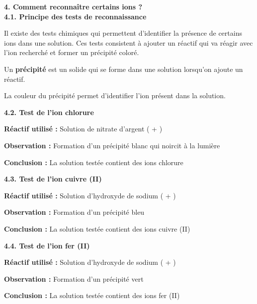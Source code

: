 \documentclass[11pt,a4paper]{article}
\begin{document}
\textbf{4. Comment reconnaître certains ions ?} \\

\textbf{4.1. Principe des tests de reconnaissance}

Il existe des tests chimiques qui permettent d'identifier la présence de certains ions dans une solution. Ces tests consistent à ajouter un réactif qui va réagir avec l'ion recherché et former un précipité coloré. \\

\begin{tcolorbox}[colback=red!5!white,colframe=red!75!black]
{
Un \textbf{précipité} est un solide qui se forme dans une solution lorsqu'on ajoute un réactif.

La couleur du précipité permet d'identifier l'ion présent dans la solution.
}
\end{tcolorbox}


\textbf{4.2. Test de l'ion chlorure }

\begin{tcolorbox}[colback=red!5!white,colframe=red!75!black]
{
\textbf{Réactif utilisé : } Solution de nitrate d'argent ( + )

\textbf{Observation : } Formation d'un précipité blanc qui noircit à la lumière

\textbf{Conclusion : } La solution testée contient des ions chlorure 
}
\end{tcolorbox}


\textbf{4.3. Test de l'ion cuivre (II) }

\begin{tcolorbox}[colback=red!5!white,colframe=red!75!black]
{
\textbf{Réactif utilisé : } Solution d'hydroxyde de sodium ( + )

\textbf{Observation : } Formation d'un précipité bleu

\textbf{Conclusion : } La solution testée contient des ions cuivre (II) 
}
\end{tcolorbox}


\textbf{4.4. Test de l'ion fer (II) }

\begin{tcolorbox}[colback=red!5!white,colframe=red!75!black]
{
\textbf{Réactif utilisé : } Solution d'hydroxyde de sodium ( + )

\textbf{Observation : } Formation d'un précipité vert

\textbf{Conclusion : } La solution testée contient des ions fer (II) 
}
\end{tcolorbox}
\end{document}
